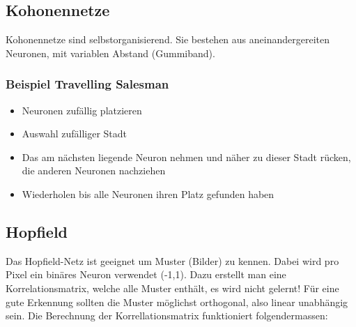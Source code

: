 \subsection{Kohonennetze}
Kohonennetze sind selbstorganisierend. Sie bestehen aus aneinandergereiten
Neuronen, mit variablen Abstand (Gummiband).

\subsubsection{Beispiel Travelling Salesman}
\begin{itemize}
	\item Neuronen zufällig platzieren
	\item Auswahl zufälliger Stadt
	\item Das am nächsten liegende Neuron nehmen und näher zu dieser Stadt rücken, die anderen Neuronen nachziehen
	\item Wiederholen bis alle Neuronen ihren Platz gefunden haben
\end{itemize}

\subsection{Hopfield}
Das Hopfield-Netz ist geeignet um Muster (Bilder) zu kennen. Dabei wird pro
Pixel ein binäres Neuron verwendet (-1,1).  Dazu erstellt man eine
Korrelationsmatrix, welche alle Muster enthält, es wird nicht gelernt!  Für eine
gute Erkennung sollten die Muster möglichst orthogonal, also linear unabhängig
sein.  Die Berechnung der Korrellationsmatrix funktioniert folgendermassen:

